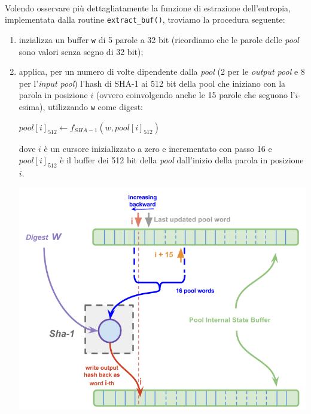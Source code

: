 \documentclass{article}
\begin{document}
 \paragraph{} Volendo osservare più dettagliatamente la funzione di estrazione
 dell'entropia, implementata dalla routine
 \verb+extract_buf()+, troviamo la procedura seguente:
 \begin{enumerate}
   \item inzializza un buffer \verb+w+ di 5 parole a 32 bit (ricordiamo che le
   parole delle \emph{pool} sono valori senza segno di 32 bit);
   \item applica, per un numero di volte dipendente dalla \emph{pool} (2 per le
   \emph{output pool} e 8 per l'\emph{input pool})  l'hash di SHA-1 ai 512 bit
   della pool che iniziano con la parola in posizione $i$ (ovvero coinvolgendo
   anche le 15 parole che seguono l'$i$-esima), utilizzando \verb+w+ come
   digest:
   \begin{center}
   $pool\left[i\right]_{512}\leftarrow f_{SHA-1}(w, pool\left[i\right]_{512})$
   \end{center}
   dove $i$ è un cursore inizializzato a zero e incrementato con passo 16 e
   $pool\left[i\right]_{512}$ è il buffer dei 512 bit della \emph{pool}
   dall'inizio della parola in posizione $i$. \\
   
              \centerline{\includegraphics[width=150mm]{img/extract1.png}} 
   

\end{enumerate}
\end{document}
